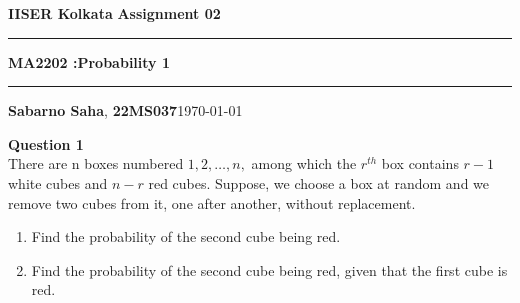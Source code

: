 \documentclass[addpoints]{exam}
\begin{document}
\par\textbf{IISER Kolkata} \hfill \textbf{Assignment 02}
\vspace{3pt}
\hrule
\vspace{3pt}
\begin{center}
        \LARGE{\textbf{MA2202 :Probability 1}}
\end{center}
\vspace{3pt}

\hrule
\vspace{4pt}
\textbf{Sabarno Saha}, \textbf{22MS037}\hfill \today
\vspace{20pt}
\bigskip
\begin{questions}
    \question \textbf{ Question 1}\\
There are n boxes numbered \(1, 2, \dots , n,\) among which the \(r^{th}\) box contains \(r - 1\) white cubes
and \(n - r\) red cubes. Suppose, we choose a box at random and we remove two cubes from it,
one after another, without replacement.
\begin{enumerate}[label = (\alph*)]
    \item  Find the probability of the second cube being red.
    \item  Find the probability of the second cube being red, given that the first cube is red.
\end{enumerate}
\begin{solution}\\
 

\end{solution}
\end{questions}
\end{document}
